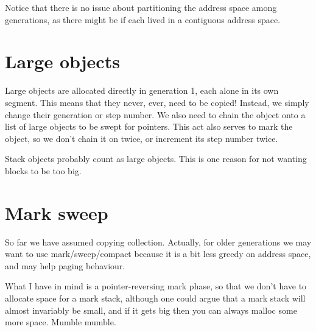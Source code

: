 \documentclass{article}
\newcommand{\block}{block}
\newcommand{\segment}{segment}
\newcommand{\step}{step}
\begin{document}
Notice that there is no issue about partitioning the address space
among generations, as there might be if each lived in a contiguous address
space.

\section{Large objects}
\label{sect:large}

Large objects are allocated directly in generation 1, each alone in its
own \segment{}.  This means that they never, ever, need to be copied!  Instead,
we simply change their generation or \step{} number.  We also need to chain the
object onto a list of large objects to be swept for pointers.  This act also
serves to mark the object, so we don't chain it on twice, or increment its
\step{} number twice.

Stack objects probably count as large objects.  This is one reason for not
wanting \block{}s to be too big.


\section{Mark sweep}

So far we have assumed copying collection.  Actually, for 
older generations we may want to use 
mark/sweep/compact because it is a bit less greedy on address
space, and may help paging behaviour.

What I have in mind is a pointer-reversing mark phase, so that we don't have
to allocate space for a mark stack, although one could argue that a mark
stack will almost invariably be small, and if it gets big then you can always
malloc some more space.  Mumble mumble.

 

\end{document}
